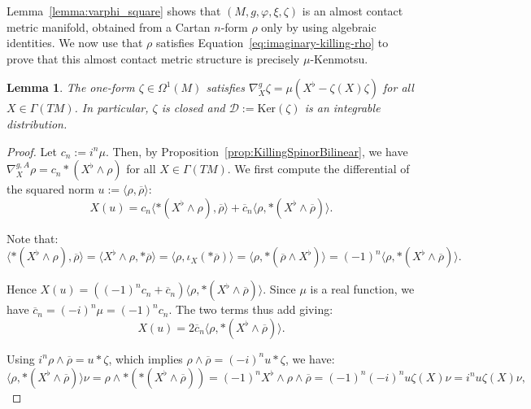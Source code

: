 \documentclass[10pt,a4paper,twoside,reqno]{amsart}
\theoremstyle{plain}
\newtheorem{lemma}[thm]{Lemma}
\theoremstyle{definition}
\theoremstyle{remark}
\newcommand{\escal}[1]{\langle#1\rangle}
\renewcommand{\ker}{\mathrm{Ker}}
\begin{document}
Lemma~\ref{lemma:varphi_square} shows that $(M,g,\varphi,\xi,\zeta)$ is an almost contact metric manifold, obtained from a Cartan $n$-form $\rho$ only by using algebraic identities. We now use that $\rho$ satisfies Equation~\eqref{eq:imaginary-killing-rho} to prove that this almost contact metric structure is precisely $\mu$-Kenmotsu.

\begin{lemma}\label{lemma:nabla_zeta}
The one-form $\zeta\in\Omega^1(M)$ satisfies $\nabla^g_X\zeta = \mu(X^\flat - \zeta(X)\zeta)$ for all $X\in \Gamma(TM)$. In particular, $\zeta$ is closed and $\mathcal{D} := \ker(\zeta)$ is an integrable distribution.
\end{lemma}

\begin{proof}
Let $c_n:=i^n\mu$. Then, by Proposition~\ref{prop:KillingSpinorBilinear}, we have $\nabla^{g,A}_X\rho=c_n*(X^\flat\wedge\rho)$ for all $X\in\Gamma(TM)$. We first compute the differential of the squared norm $u:=\escal{\rho,\overline{\rho}}$:
\begin{equation*}
X(u)=c_n\escal{*(X^\flat\wedge\rho),\overline{\rho}}+\overline{c}_n\escal{\rho,*(X^\flat\wedge\overline{\rho})}.
\end{equation*}

\noindent
Note that:
\begin{equation*}
\escal{*(X^\flat\wedge\rho),\overline{\rho}}=\escal{X^\flat\wedge\rho,*\overline{\rho}}=\escal{\rho,\iota_X(*\overline{\rho})}=\escal{\rho,*(\overline{\rho}\wedge X^\flat)}=(-1)^n\escal{\rho,*(X^\flat\wedge\overline{\rho})}.
\end{equation*}

\noindent
Hence $X(u)=((-1)^nc_n+\overline{c}_n)\escal{\rho,*(X^\flat\wedge\overline{\rho})}$. Since $\mu$ is a real function, we have $\overline{c}_n=(-i)^n\mu=(-1)^n c_n$. The two terms thus add giving:
\begin{equation*}
X(u)=2\overline{c}_n\escal{\rho,*(X^\flat\wedge\overline{\rho})}.
\end{equation*}

\noindent
Using $i^n\rho\wedge\overline{\rho} = u *\zeta$, which implies $\rho\wedge\overline{\rho} = (-i)^n u *\zeta$, we have:
\begin{equation*}
\escal{\rho,*(X^\flat\wedge\overline{\rho})}\nu = \rho\wedge *(*(X^\flat\wedge\overline{\rho})) = (-1)^n X^\flat\wedge\rho\wedge\overline{\rho} = (-1)^n(-i)^n u\zeta(X)\nu = i^n u \zeta(X) \nu,
\end{equation*}


\end{proof}
\end{document}
